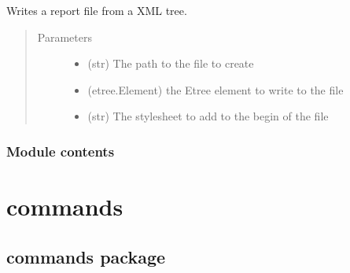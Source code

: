 \documentclass[a4paper,10pt,english]{sphinxmanual}
\begin{document}
\begin{fulllineitems}
\label{\detokenize{apidoc_src/src:src.xmlManager.write_report}}
Writes a report file from a XML tree.
\begin{quote}\begin{description}
\item[{Parameters}] \leavevmode\begin{itemize}
\item {} 
 \textendash{} (str) The path to the file to create

\item {} 
 \textendash{} (etree.Element) the Etree element to write to the file

\item {} 
 \textendash{} (str) The stylesheet to add to the begin of the file

\end{itemize}

\end{description}\end{quote}

\end{fulllineitems}



\subsubsection{Module contents}
\label{\detokenize{apidoc_src/src:module-src}}\label{\detokenize{apidoc_src/src:module-contents}}

\section{commands}
\label{\detokenize{apidoc_commands/modules:commands}}\label{\detokenize{apidoc_commands/modules::doc}}

\subsection{commands package}
\label{\detokenize{apidoc_commands/commands::doc}}\label{\detokenize{apidoc_commands/commands:commands-package}}
\end{document}
